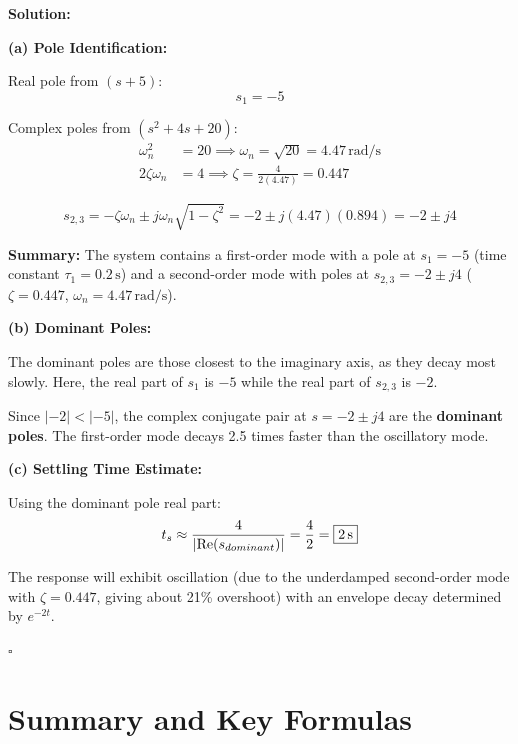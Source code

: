 \textbf{Solution:}

\textbf{(a) Pole Identification:}

Real pole from $(s+5)$:
\begin{equation}
s_1 = -5
\end{equation}

Complex poles from $(s^2 + 4s + 20)$:
\begin{align}
\omega_n^2 &= 20 \implies \omega_n = \sqrt{20} = 4.47\,\text{rad/s} \\
2\zeta\omega_n &= 4 \implies \zeta = \frac{4}{2(4.47)} = 0.447
\end{align}

\begin{equation}
s_{2,3} = -\zeta\omega_n \pm j\omega_n\sqrt{1-\zeta^2} = -2 \pm j(4.47)(0.894) = -2 \pm j4
\end{equation}

\textbf{Summary:} The system contains a first-order mode with a pole at $s_1 = -5$ (time constant $\tau_1 = 0.2\,\text{s}$) and a second-order mode with poles at $s_{2,3} = -2 \pm j4$ ($\zeta = 0.447$, $\omega_n = 4.47\,\text{rad/s}$).

\textbf{(b) Dominant Poles:}

The dominant poles are those closest to the imaginary axis, as they decay most slowly. Here, the real part of $s_1$ is $-5$ while the real part of $s_{2,3}$ is $-2$.

Since $|-2| < |-5|$, the complex conjugate pair at $s = -2 \pm j4$ are the \textbf{dominant poles}. The first-order mode decays 2.5 times faster than the oscillatory mode.

\textbf{(c) Settling Time Estimate:}

Using the dominant pole real part:
\begin{equation}
t_s \approx \frac{4}{|\mathrm{Re}(s_{dominant})|} = \frac{4}{2} = \boxed{2\,\text{s}}
\end{equation}

The response will exhibit oscillation (due to the underdamped second-order mode with $\zeta = 0.447$, giving about 21\% overshoot) with an envelope decay determined by $e^{-2t}$.

\hfill$\square$

\section{Summary and Key Formulas}

